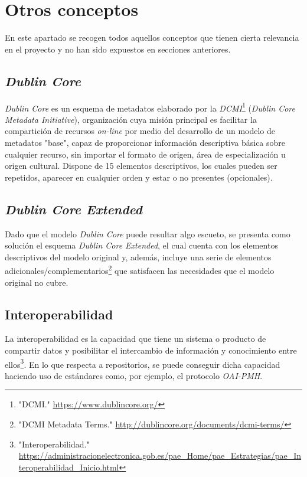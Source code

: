 \documentclass[
]{article}
\begin{document}
\hypertarget{otros-conceptos}{%
\section{Otros conceptos}\label{otros-conceptos}}

En este apartado se recogen todos aquellos conceptos que tienen cierta
relevancia en el proyecto y no han sido expuestos en secciones
anteriores.

\hypertarget{dublin-core}{%
\subsection{\texorpdfstring{\emph{Dublin
Core}}{Dublin Core}}\label{dublin-core}}

\emph{Dublin Core} es un esquema de metadatos elaborado por la
\emph{DCMI}\footnote{"DCMI." \url{https://www.dublincore.org/}}
(\emph{Dublin Core Metadata Initiative}), organización cuya misión
principal es facilitar la compartición de recursos \emph{on-line} por
medio del desarrollo de un modelo de metadatos "base", capaz de
proporcionar información descriptiva básica sobre cualquier recurso, sin
importar el formato de origen, área de especialización u origen
cultural. Dispone de 15 elementos descriptivos, los cuales pueden ser
repetidos, aparecer en cualquier orden y estar o no presentes
(opcionales).

\hypertarget{dublin-core-extended}{%
\subsection{\texorpdfstring{\emph{Dublin Core
Extended}}{Dublin Core Extended}}\label{dublin-core-extended}}

Dado que el modelo \emph{Dublin Core} puede resultar algo escueto, se
presenta como solución el esquema \emph{Dublin Core Extended}, el cual
cuenta con los elementos descriptivos del modelo original y, además,
incluye una serie de elementos adicionales/complementarios\footnote{"DCMI
  Metadata Terms." \url{http://dublincore.org/documents/dcmi-terms/}}
que satisfacen las necesidades que el modelo original no cubre.

\hypertarget{interoperabilidad}{%
\subsection{Interoperabilidad}\label{interoperabilidad}}

La interoperabilidad es la capacidad que tiene un sistema o producto de
compartir datos y posibilitar el intercambio de información y
conocimiento entre ellos\footnote{"Interoperabilidad."
  \url{https://administracionelectronica.gob.es/pae_Home/pae_Estrategias/pae_Interoperabilidad_Inicio.html}}.
En lo que respecta a repositorios, se puede conseguir dicha capacidad
haciendo uso de estándares como, por ejemplo, el protocolo
\emph{OAI-PMH}.
\end{document}
